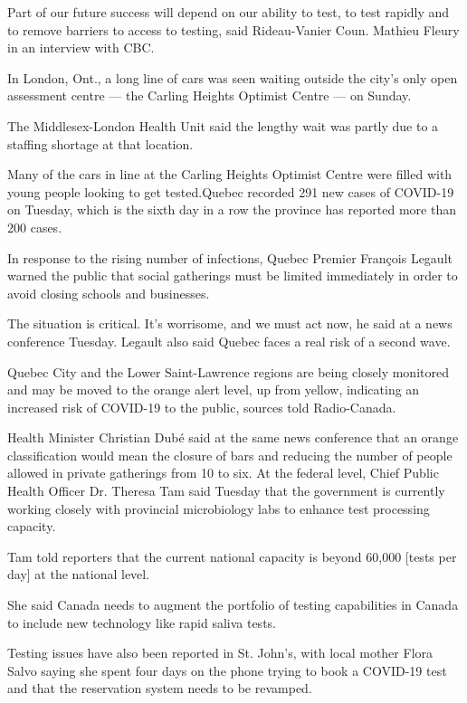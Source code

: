 \documentclass[]{article}
\newenvironment{Shaded}{\begin{snugshade}}{\end{snugshade}}
\newcommand{\StringTok}[1]{\textcolor[rgb]{0.31,0.60,0.02}{#1}}
\begin{document}
\begin{Shaded}
\begin{Highlighting}[]
\StringTok{Part of our future success will depend on our ability to test, to test rapidly and to remove barriers to access to testing, said Rideau-Vanier Coun. Mathieu Fleury in an interview with CBC.}

\StringTok{In London, Ont., a long line of cars was seen waiting outside the city's only open assessment centre — the Carling Heights Optimist Centre — on Sunday.}

\StringTok{The Middlesex-London Health Unit said the lengthy wait was partly due to a staffing shortage at that location.}

\StringTok{Many of the cars in line at the Carling Heights Optimist Centre were filled with young people looking to get tested.Quebec recorded 291 new cases of COVID-19 on Tuesday, which is the sixth day in a row the province has reported more than 200 cases.}

\StringTok{In response to the rising number of infections, Quebec Premier François Legault warned the public that social gatherings must be limited immediately in order to avoid closing schools and businesses.}

\StringTok{The situation is critical. It's worrisome, and we must act now, he said at a news conference Tuesday. Legault also said Quebec faces a real risk of a second wave.}

\StringTok{Quebec City and the Lower Saint-Lawrence regions are being closely monitored and may be moved to the orange alert level, up from yellow, indicating an increased risk of COVID-19 to the public, sources told Radio-Canada.}

\StringTok{Health Minister Christian Dubé said at the same news conference that an orange classification would mean the closure of bars and reducing the number of people allowed in private gatherings from 10 to six. At the federal level, Chief Public Health Officer Dr. Theresa Tam said Tuesday that the government is currently working closely with provincial microbiology labs to enhance test processing capacity. }

\StringTok{Tam told reporters that the current national capacity is beyond 60,000 [tests per day] at the national level.  }

\StringTok{She said Canada needs to augment the portfolio of testing capabilities in Canada to include new technology like rapid saliva tests.  }

\StringTok{Testing issues have also been reported in St. John's, with local mother Flora Salvo saying she spent four days on the phone trying to book a COVID-19 test and that the reservation system needs to be revamped.}


\end{Highlighting}
\end{Shaded}
\end{document}
